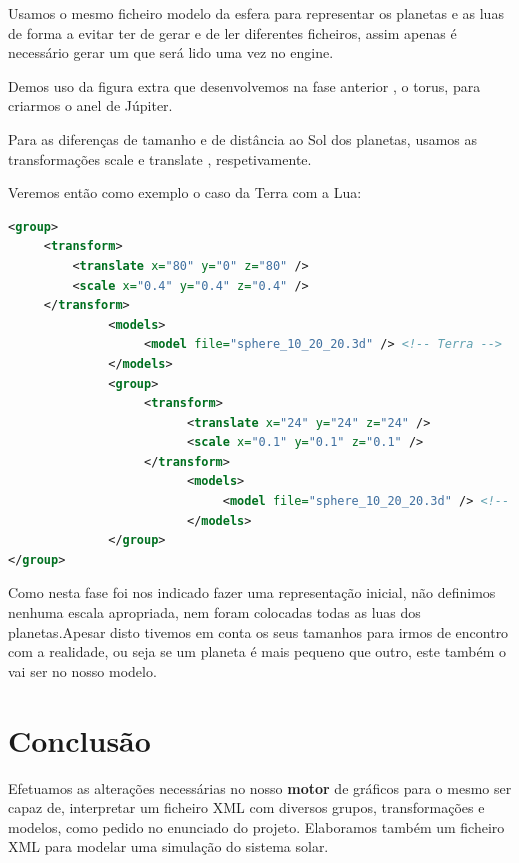 \documentclass[14pt, a4paper]{article}
\begin{document}
Usamos o mesmo ficheiro modelo da esfera para representar os planetas e as luas de forma a evitar ter de gerar e de ler diferentes ficheiros, assim apenas é necessário gerar um que será lido uma vez no engine.

Demos uso da figura extra que desenvolvemos na fase anterior , o torus, para criarmos o anel de Júpiter.

Para as diferenças de tamanho e de distância ao Sol dos planetas, usamos as transformações scale e translate , respetivamente.

Veremos então como exemplo o caso da Terra com a Lua:
\begin{lstlisting}[language=XML]
<group> 
     <transform>
         <translate x="80" y="0" z="80" />
         <scale x="0.4" y="0.4" z="0.4" />
     </transform>
              <models> 
                   <model file="sphere_10_20_20.3d" /> <!-- Terra -->
              </models>
              <group> 
                   <transform> 
                         <translate x="24" y="24" z="24" />
                         <scale x="0.1" y="0.1" z="0.1" />
                   </transform>
                         <models> 
                              <model file="sphere_10_20_20.3d" /> <!-- Lua -->
                         </models>
              </group>						
</group>
\end{lstlisting}

Como nesta fase foi nos indicado fazer uma representação inicial, não definimos nenhuma escala apropriada, nem foram colocadas todas as luas dos planetas.Apesar disto tivemos em conta os seus tamanhos para irmos de encontro com a realidade, ou seja se um planeta é mais pequeno que outro, este também o vai ser no nosso modelo.

\section{Conclusão} \label{sec:conclusion}

Efetuamos as alterações necessárias no nosso \textbf{motor} de gráficos para o mesmo ser capaz de, interpretar um ficheiro XML com diversos grupos, transformações e modelos, como pedido no enunciado do projeto. Elaboramos também um ficheiro XML para modelar uma simulação do sistema solar.
\end{document}
